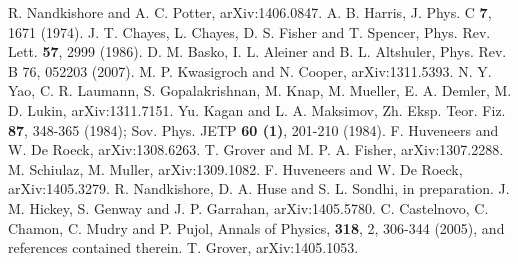 \documentclass[amsmath,onecolumn, superscriptaddress,preprint,aps]{revtex4}
\begin{document}
\begin{thebibliography}{99}
R. Nandkishore and A. C. Potter, arXiv:1406.0847.
A. B. Harris, J. Phys. C {\bf 7}, 1671 (1974).
J. T. Chayes, L. Chayes, D. S. Fisher and T. Spencer, Phys. Rev. Lett. {\bf 57}, 2999 (1986).
D. M. Basko, I. L. Aleiner and B. L. Altshuler, Phys. Rev. B 76, 052203 (2007).
M. P. Kwasigroch and N. Cooper, arXiv:1311.5393.
N. Y. Yao, C. R. Laumann, S. Gopalakrishnan, M. Knap, M. Mueller, E. A. Demler, M. D. Lukin, arXiv:1311.7151.
Yu. Kagan and L. A. Maksimov, Zh. Eksp. Teor. Fiz. {\bf 87}, 348-365 (1984); Sov. Phys. JETP {\bf 60 (1)}, 201-210 (1984).
F. Huveneers and W. De Roeck, arXiv:1308.6263.
T. Grover and M. P. A. Fisher, arXiv:1307.2288.
M. Schiulaz, M. Muller, arXiv:1309.1082.
F. Huveneers and W. De Roeck, arXiv:1405.3279.
R. Nandkishore, D. A. Huse and S. L. Sondhi, in preparation.
J. M. Hickey, S. Genway and J. P. Garrahan, arXiv:1405.5780.
C. Castelnovo, C. Chamon, C. Mudry and P. Pujol, Annals of Physics, {\bf 318}, 2, 306-344 (2005), and references contained therein.
T. Grover, arXiv:1405.1053.
\end{thebibliography}
\end{document}
